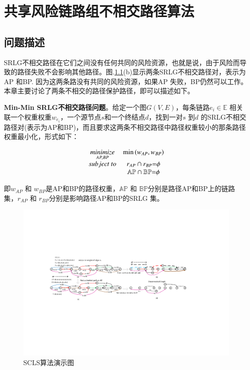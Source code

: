 \chapter{共享风险链路组不相交路径算法}

\section{问题描述}
SRLG不相交路径在它们之间没有任何共同的风险资源，也就是说，由于风险而导致的路径失败不会影响其他路径。图.\ref{fig:CompositeGraph}(b)显示两条SRLG不相交路径对，表示为AP 和BP. 因为这两条路没有共同的风险资源，如果AP 失败，BP仍然可以工作。本章主要讨论了两条不相交的路径保护路径，即可以描述如下。

\textbf{Min-Min SRLG不相交路径问题}。给定一个图$G(V,E)$，每条链路$e_i\in \mathbb{E}$ 相关联一个权重权重$w_{e_i}$，一个源节点$s$和一个终结点$d$，找到一对$s$ 到$d$ 的SRLG不相交路径对(表示为AP和BP)，而且要求这两条不相交路径中路径权重较小的那条路径权重最小化，形式如下：

\begin{equation}
\begin{array}{*{20}{c}}
   {\mathop {minimize}\limits_{AP,BP} } & {\min \left( {{w_{AP}},{w_{BP}}} \right)}  \\
   {subject\ to} & {{r_{AP}} \cap {r_{BP}}{\rm{ = }}\phi }  \\
   {} & {\mathbb{AP} \cap \mathbb{BP}{\rm{ = }}\phi }  \\
\end{array}
\label{eq:problem definition}
\end{equation}

即${w_{AP}}$ 和 ${w_{BP}}$是AP和BP的路径权重，$\mathbb{AP}$ 和 $\mathbb{BP}$分别是路径AP和BP上的链路集，${r_{AP}}$ 和 ${r_{BP}}$分别是影响路径AP和BP的SRLG 集。


\begin{figure}[tp]
  \centering
  \includegraphics[width=7.2in]{figures/CompositeGraph}
  \caption{SCLS算法演示图 }
  \label{fig:CompositeGraph}
\end{figure}

